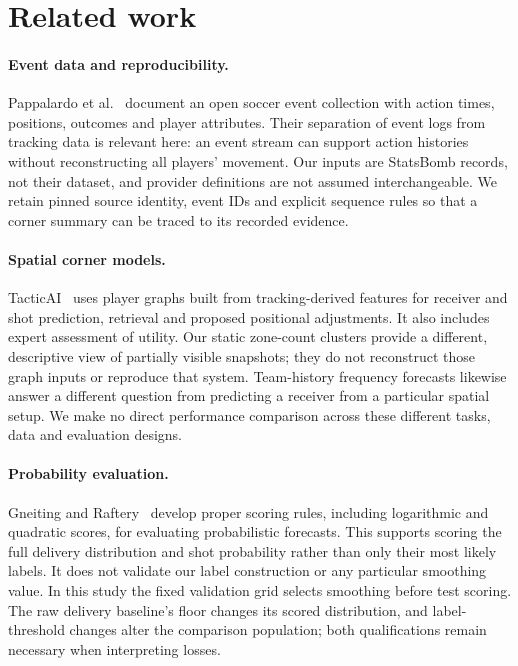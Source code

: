 \documentclass[sigconf,nonacm]{acmart}
\begin{document}
\section{Related work}
\paragraph{Event data and reproducibility.}
Pappalardo et al.~\cite{pappalardo2019} document an open soccer event collection
with action times, positions, outcomes and player attributes. Their separation
of event logs from tracking data is relevant here: an event stream can support
action histories without reconstructing all players' movement. Our inputs are
StatsBomb records, not their dataset, and provider definitions are not assumed
interchangeable. We retain pinned source identity, event IDs and explicit
sequence rules so that a corner summary can be traced to its recorded evidence.

\paragraph{Spatial corner models.}
TacticAI~\cite{wang2024} uses player graphs built from tracking-derived features
for receiver and shot prediction, retrieval and proposed positional adjustments.
It also includes expert assessment of utility. Our static zone-count clusters
provide a different, descriptive view of partially visible snapshots; they do
not reconstruct those graph inputs or reproduce that system. Team-history
frequency forecasts likewise answer a different question from predicting a
receiver from a particular spatial setup. We make no direct performance
comparison across these different tasks, data and evaluation designs.

\paragraph{Probability evaluation.}
Gneiting and Raftery~\cite{gneiting2007} develop proper scoring rules, including
logarithmic and quadratic scores, for evaluating probabilistic forecasts. This
supports scoring the full delivery distribution and shot probability rather
than only their most likely labels. It does not validate our label construction
or any particular smoothing value. In this study the fixed validation grid
selects smoothing before test scoring. The raw delivery baseline's floor changes
its scored distribution, and label-threshold changes alter the comparison
population; both qualifications remain necessary when interpreting losses.
\end{document}
